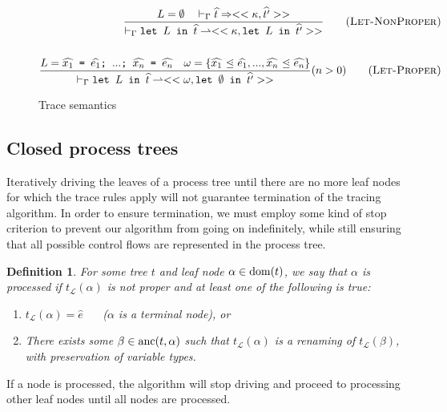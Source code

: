 \documentclass[10pt]{../sigplanconf}
\newcommand{\dom}{\ensuremath{{\rm dom}}}
\newcommand{\anc}{\ensuremath{{\rm anc}}}
\newcommand{\gen}{\ensuremath{~{\leq\kern-6pt \raisebox{1pt}{$\cdot$}}~}}
\newcommand{\nfrac}[2]{\frac{\displaystyle{#1}}{\displaystyle{#2}}}
\newcommand{\tagsc}[1]{\tag{\scshape #1}}
\newtheorem{definition}{Definition}
\begin{document}
\begin{figure*}
  ~\newline

  \begin{align}
    \nfrac{
      L=\emptyset \quad |-_\Gamma \widehat{t} => << \kappa, \widehat{t'} >>
    }{
      |-_\Gamma \texttt{let $L$ in $\widehat{t}$} \rightharpoonup <<\kappa, \texttt{let $L$ in $\widehat{t'}$}>>
    } \tagsc{Let-NonProper}
\\\nonumber\\
    \nfrac{
     L = \texttt{$\widehat{x_1}$ = $\widehat{e_1}$; $...$; $\widehat{x_n}$ = $\widehat{e_n}$}\quad
     \omega = \{ \widehat{x_1} \gen \widehat{e_1}, ..., \widehat{x_n} \gen \widehat{e_n} \}
    }{
      |-_\Gamma \texttt{let $L$ in $\widehat{t}$} \rightharpoonup <<\omega, \texttt{let $\emptyset$ in $\widehat{t'}$} >>
    } (n > 0) \tagsc{Let-Proper}
  \end{align}

  \caption{Trace semantics}
  \label{fig:tracing}
\end{figure*}


\subsection{Closed process trees}
Iteratively driving the leaves of a process tree until there are no
more leaf nodes for which the trace rules apply will not guarantee
termination of the tracing algorithm. In order to ensure termination,
we must employ some kind of stop criterion to prevent our algorithm
from going on indefinitely, while still ensuring that all possible
control flows are represented in the process tree.
\begin{definition}
  For some tree $t$ and leaf node $\alpha \in \dom(t)$, we say that
  $\alpha$ is \emph{processed} if $t_\mathcal{L}(\alpha)$ is not
  proper and at least one of the following is true:
  \begin{enumerate}
    \item $t_\mathcal{L}(\alpha) = \widehat{e}$ ~~ ($\alpha$ is a terminal node), or
    \item There exists some $\beta \in \anc(t, \alpha)$ such that
      $t_\mathcal{L}(\alpha)$ is a renaming of $t_\mathcal{L}(\beta)$,
      with preservation of variable types.
  \end{enumerate}
\end{definition}
If a node is processed, the algorithm will stop driving and proceed to
processing other leaf nodes until all nodes are processed.
\end{document}
